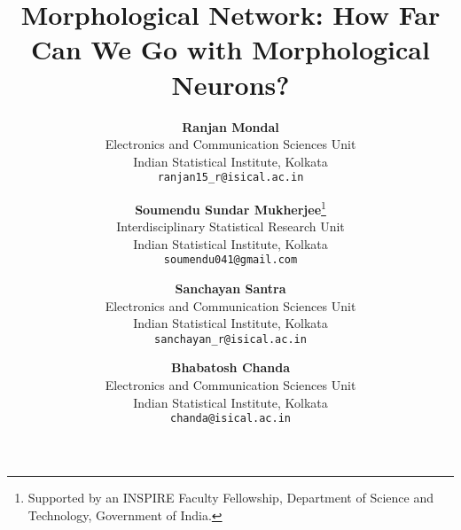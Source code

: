 \documentclass[12pt]{article}
\begin{document}
\title{\bf Morphological Network: How Far Can We Go with Morphological Neurons?}
\author{
\normalsize{\textbf{Ranjan Mondal}}\\
\normalsize{Electronics and Communication Sciences Unit}\\
\normalsize{Indian Statistical Institute, Kolkata}\\
{\tt\small ranjan15\_r@isical.ac.in}\\
\and
\normalsize{\textbf{Soumendu Sundar Mukherjee}\thanks{Supported by an INSPIRE Faculty Fellowship, Department of Science and Technology, Government of India.}}\\
\normalsize{Interdisciplinary Statistical Research Unit}\\
\normalsize{Indian Statistical Institute, Kolkata}\\
{\tt\small soumendu041@gmail.com}\\
\and
\normalsize{\textbf{Sanchayan Santra}}\\
\normalsize{Electronics and Communication Sciences Unit}\\
\normalsize{Indian Statistical Institute, Kolkata}\\
{\tt\small sanchayan\_r@isical.ac.in}\\
\and
\normalsize{\textbf{Bhabatosh Chanda}}\\
\normalsize{Electronics and Communication Sciences Unit}\\
\normalsize{Indian Statistical Institute, Kolkata}\\
{\tt\small chanda@isical.ac.in}
}



\maketitle
\end{document}
